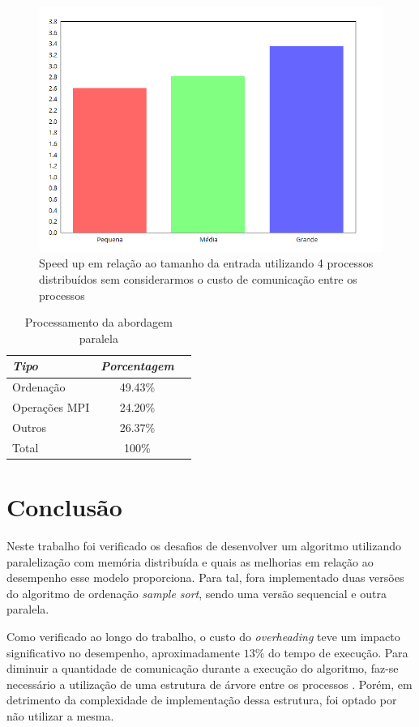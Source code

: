 \documentclass[letterpaper, 10 pt, conference]{ieeeconf}  %
\begin{document}
\begin{figure}[htbp]
      \centering
      \includegraphics[scale=0.35]{sem_over.png}
      \caption{ Speed up em relação ao tamanho da entrada utilizando 4 processos distribuídos sem considerarmos o custo de comunicação entre os processos}
      \label{figurelabel5}
\end{figure}


{
\begin{table}[htbp]
\centering
\caption{Processamento da abordagem paralela}
\begin{tabular}{lcc}
\hline
\textit{Tipo} & \textit{Porcentagem} \\ \hline
Ordenação & 49.43\% \\
Operações MPI & 24.20\%  \\
Outros & 26.37\% \\ \hline
Total & 100\% \\ \hline
\end{tabular}
\label{table:db-segmentation-distribution}
\end{table}
}


\section{Conclusão}
Neste trabalho foi verificado os desafios de desenvolver um algoritmo utilizando paralelização com memória distribuída e quais as melhorias em relação ao desempenho esse modelo proporciona. Para tal, fora implementado duas versões do algoritmo de ordenação \textit{sample sort}, sendo uma versão sequencial e outra paralela. 

Como verificado ao longo do trabalho, o custo do \textit{overheading} teve um impacto significativo no desempenho, aproximadamente $13\%$ do tempo de execução. Para diminuir a quantidade de comunicação durante a execução do algoritmo, faz-se necessário a utilização de uma estrutura de árvore entre os processos \cite{c8}. Porém, em detrimento da complexidade de implementação dessa estrutura, foi optado por não utilizar a mesma.
\end{document}

